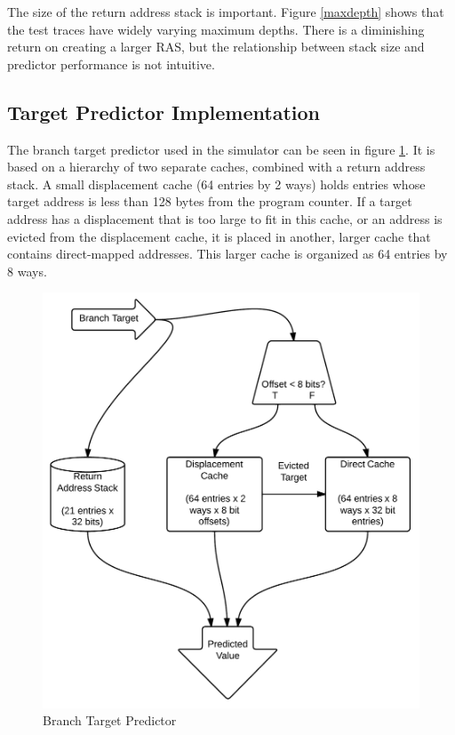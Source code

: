 \documentclass[twocolumn]{article}
\newcommand{\centerimage}[3]{
\begin{figure}[ht!]  
\begin{center} #1
\caption{#2}
\label{#3}
\end{center}
\end{figure}}
\begin{document}
The size of the return address stack is important. Figure
\ref{maxdepth} shows that the test traces have widely varying maximum
depths. There is a diminishing return on creating a larger RAS, but
the relationship between stack size and predictor performance is not
intuitive. 

\subsection{Target Predictor Implementation}

The branch target predictor used in the simulator can be seen in
figure \ref{btbshape}. It is based on a hierarchy of two separate
caches, combined with a return address stack. A small displacement
cache (64 entries by 2 ways) holds entries whose target address is
less than 128 bytes from the program counter. If a target address has
a displacement that is too large to fit in this cache, or an address
is evicted from the displacement cache, it is placed in another,
larger cache that contains direct-mapped addresses. This larger cache
is organized as 64 entries by 8 ways.

\centerimage{\includegraphics[width=\columnwidth]{BTB.png}}{Branch
  Target Predictor}{btbshape}
\end{document}
